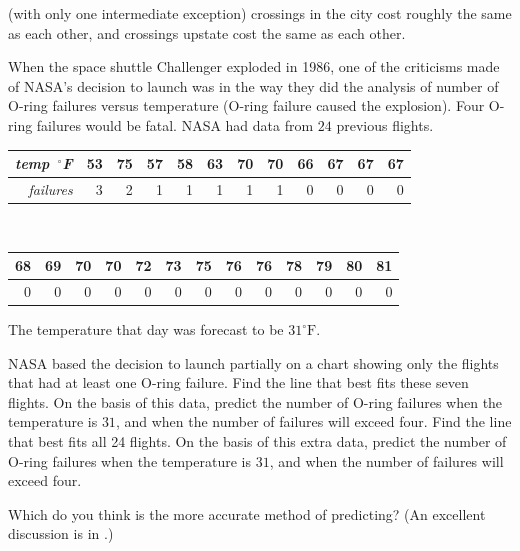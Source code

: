 \begin{exercises}
\begin{answer}
      (with only one intermediate exception) crossings in the city
      cost roughly the same as each other,
      and crossings upstate cost the same as each other.
    \end{answer}
  \item 
    When the space shuttle Challenger exploded in 1986, one of the
    criticisms made of NASA's decision to launch was in the way they did the
    analysis of number of O-ring failures versus temperature
    (O-ring failure caused the explosion).
    Four O-ring failures would be fatal.
    NASA had data from $24$ previous flights.
    \begin{center}
      \begin{tabular}{r|rrrrrrrrrrr}
         \textit{temp\ ${}^\circ$F} 
            &53 &75 &57 &58 &63 &70 &70 &66 &67 &67 &67 \\
         \hline
         \textit{failures}  
            &3  &2  &1  &1  &1  &1  &1  &0  &0  &0  &0
      \end{tabular}\hspace*{3em}                                           \\
      \hspace*{3em}\begin{tabular}{|rrrrrrrrrrrrr}
                68 &69 &70 &70 &72 &73 &75 &76 &76 &78 &79 &80 &81\\
         \hline
                0  &0  &0  &0  &0  &0  &0  &0  &0  &0  &0  &0  &0
      \end{tabular}
    \end{center}
    The temperature that day was forecast to be \( 31^\circ\text{F} \).
    \begin{exparts}
      \partsitem NASA based the decision to launch partially on a chart showing
        only the flights that had at least one O-ring failure.
        Find the line that best fits these seven flights.
        On the basis of this data,
        predict the number of O-ring failures when the temperature is $31$, and
        when the number of failures will exceed four.
      \partsitem Find the line that best fits all 24 flights.
        On the basis of this extra data,
        predict the number of O-ring failures when the temperature is $31$, and
        when the number of failures will exceed four.
    \end{exparts}
    Which do you think is the more accurate method of predicting?
    (An excellent discussion is in \cite{Stats}.)
    \begin{answer}
      \begin{exparts}

\end{exparts}
\end{answer}
\end{exercises}

